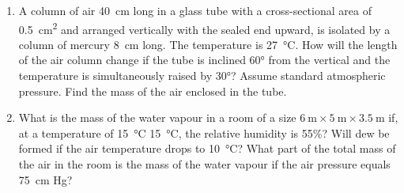\documentclass[a4paper,sfsidenotes]{tufte-book}
\begin{document}
\begin{enumerate}[resume=problems]
\begin{marginfigure}
\caption{Work done by a gas.}
\label{fig-85}
\end{marginfigure}
\item A column of air \SI{40}{\centi\meter} long in a glass tube with a cross-sectional area of \SI{0.5}{\centi\meter^{2}} and arranged vertically with the sealed end upward, is isolated by a column of mercury \SI{8}{\centi\meter} long. The temperature is \SI{27}{\degreeCelsius}. How will the length of the air column change if the tube is inclined \ang{60} from the vertical and the temperature is simultaneously raised by \ang{30}? Assume standard atmospheric pressure. Find the mass of the air enclosed in the tube.
\item What is the mass of the water vapour in a room of a size $\SI{6}{\metre} \times  \SI{5}{\metre} \times \SI{3.5}{\metre}$ if, at a temperature of \SI{15}{\degree}C \SI{15}{\degreeCelsius}, the relative humidity is 55\%? Will dew be formed if the air temperature drops to \SI{10}{\degreeCelsius}? What part of the total mass of the air in the room is the mass of the water vapour if the air pressure equals \SI{75}{\centi\meter} Hg?
\end{enumerate}

\cleardoublepage
\thispagestyle{empty}
\vspace*{2cm}
\end{document}
